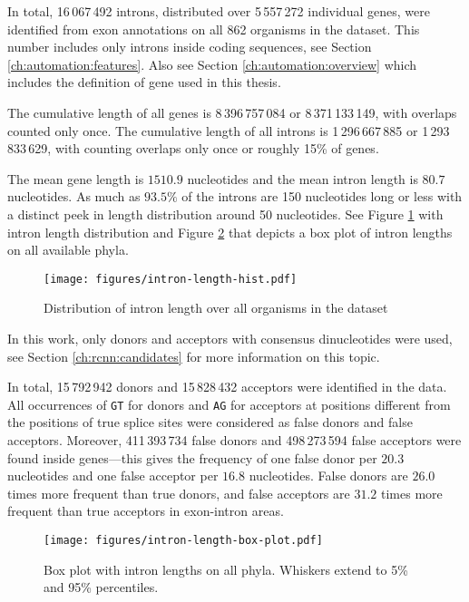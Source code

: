 In total, 16\,067\,492 introns, distributed over 5\,557\,272 individual genes,
were identified from exon annotations on all 862 organisms in the dataset. This
number includes only introns inside coding sequences, see Section
\ref{ch:automation:features}. Also see Section \ref{ch:automation:overview}
which includes the definition of gene used in this thesis.

The cumulative length of all genes is 8\,396\,757\,084 or 8\,371\,133\,149,
with overlaps counted only once. The cumulative length of all introns is
1\,296\,667\,885 or 1\,293\,833\,629, with counting overlaps only once or
roughly 15\% of genes.

The mean gene length is $1510.9$ nucleotides and the mean intron length is
$80.7$ nucleotides. As much as $93.5\%$ of the introns are 150 nucleotides long
or less with a distinct peek in length distribution around 50 nucleotides. See
Figure \ref{fig:data:intron-len-dist} with intron length distribution and
Figure \ref{fig:data:intron-len-box-plot} that depicts a box plot of intron
lengths on all available phyla.

\begin{figure}
  \centering
  \texttt{[image: figures/intron-length-hist.pdf]}
  \caption{Distribution of intron length over all organisms in the dataset}
  \label{fig:data:intron-len-dist}
\end{figure}

In this work, only donors and acceptors with consensus dinucleotides were used,
see Section \ref{ch:rcnn:candidates} for more information on this topic.

In total, 15\,792\,942 donors and 15\,828\,432 acceptors were identified in the
data. All occurrences of \Verb_GT_ for donors and \Verb_AG_ for acceptors at
positions different from the positions of true splice sites were considered as
false donors and false acceptors. Moreover, 411\,393\,734 false donors and
498\,273\,594 false acceptors were found inside genes---this gives the
frequency of one false donor per $20.3$ nucleotides and one false acceptor per
$16.8$ nucleotides. False donors are $26.0$ times more frequent than true
donors, and false acceptors are $31.2$ times more frequent than true acceptors
in exon-intron areas.

\begin{figure}
  \centering
  \texttt{[image: figures/intron-length-box-plot.pdf]}
  \caption{Box plot with intron lengths on all phyla. Whiskers extend to 5\%
    and 95\% percentiles.}
  \label{fig:data:intron-len-box-plot}
\end{figure}
